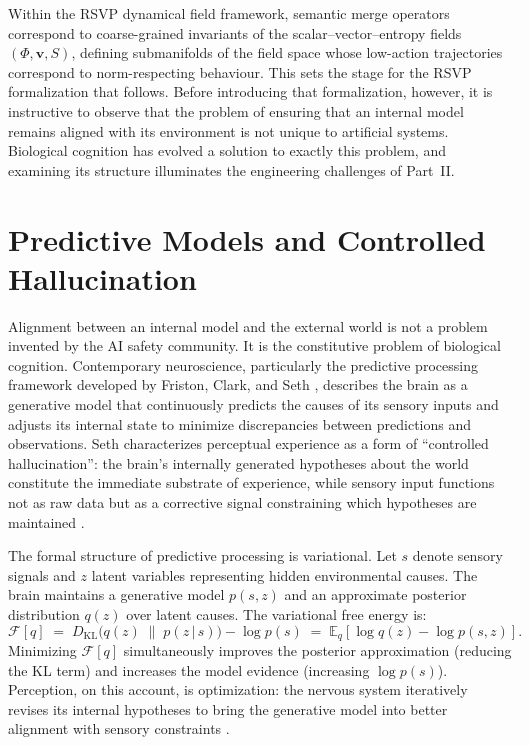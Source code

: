 \documentclass[12pt]{article}
\theoremstyle{definition}
\begin{document}
Within the RSVP dynamical field framework, semantic merge operators correspond
to coarse-grained invariants of the scalar--vector--entropy fields $(\Phi,
\mathbf{v}, S)$, defining submanifolds of the field space whose low-action
trajectories correspond to norm-respecting behaviour. This sets the stage for
the RSVP formalization that follows. Before introducing that formalization,
however, it is instructive to observe that the problem of ensuring that an
internal model remains aligned with its environment is not unique to artificial
systems. Biological cognition has evolved a solution to exactly this problem,
and examining its structure illuminates the engineering challenges of Part~II.

\section{Predictive Models and Controlled Hallucination}
\label{sec:predictive}

Alignment between an internal model and the external world is not a problem
invented by the AI safety community. It is the constitutive problem of
biological cognition. Contemporary neuroscience, particularly the predictive
processing framework developed by Friston, Clark, and Seth
\citep{friston2010,Clark2013,seth2021being}, describes the brain as a
generative model that continuously predicts the causes of its sensory inputs
and adjusts its internal state to minimize discrepancies between predictions
and observations. Seth characterizes perceptual experience as a form of
``controlled hallucination'': the brain's internally generated hypotheses about
the world constitute the immediate substrate of experience, while sensory input
functions not as raw data but as a corrective signal constraining which
hypotheses are maintained \citep{seth2021being,Hohwy2013}.

The formal structure of predictive processing is variational. Let $s$ denote
sensory signals and $z$ latent variables representing hidden environmental
causes. The brain maintains a generative model $p(s, z)$ and an approximate
posterior distribution $q(z)$ over latent causes. The variational free energy
is:
\begin{equation}
  \mathcal{F}[q]
  \;=\;
  D_{\mathrm{KL}}\bigl(q(z) \;\|\; p(z\,|\,s)\bigr) - \log p(s)
  \;=\;
  \mathbb{E}_{q}[\log q(z) - \log p(s,z)].
\end{equation}
Minimizing $\mathcal{F}[q]$ simultaneously improves the posterior approximation
(reducing the KL term) and increases the model evidence (increasing $\log p(s)$).
Perception, on this account, is optimization: the nervous system iteratively
revises its internal hypotheses to bring the generative model into better
alignment with sensory constraints \citep{friston2010}.
\end{document}
